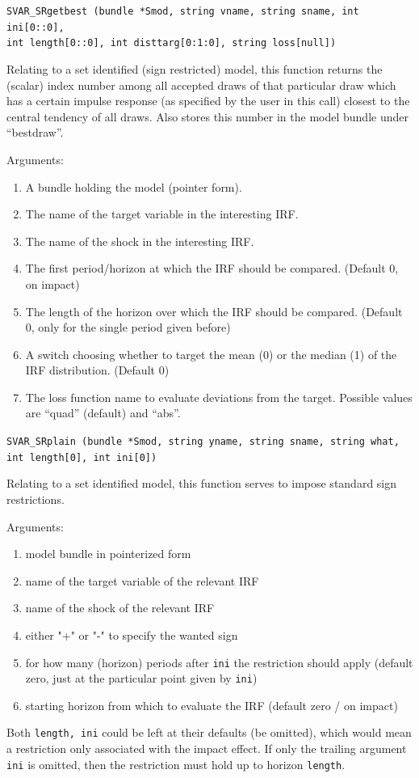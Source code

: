 \documentclass[a4paper,10pt]{article}
\newenvironment{funcdoc}[1]
{\noindent\hrulefill\newline\nopagebreak\texttt{#1}%
\nopagebreak\par\noindent\hrulefill%
\nopagebreak\par\nopagebreak\smallskip\nopagebreak\par}
{\bigskip}
\begin{document}
\begin{funcdoc}{SVAR\_SRgetbest (bundle *Smod, string vname, string sname,
    int ini[0::0], \\ int length[0::0],  int disttarg[0:1:0],  string loss[null]) }
  \noindent Relating to a set identified (sign restricted) model, this function returns
   the (scalar) index number among all accepted draws of that particular draw which has 
   a certain impulse response (as specified by the user in this call) closest to the central 
   tendency of all draws. Also stores this number in the model bundle under ``bestdraw''. 
   
  \noindent Arguments:
  \begin{enumerate}
  \item A bundle holding the model (pointer form).
  \item The name of the target variable in the interesting IRF.
  \item The name of the shock in the interesting IRF.
  \item The first period/horizon at which the IRF should be compared. (Default 0, on impact)
  \item The length of the horizon over which the IRF should be compared. (Default 0, only
  for the single period given before)
  \item A switch choosing whether to target the mean (0) or the median (1) of the IRF 
  distribution. (Default 0)
  \item The loss function name to evaluate deviations from the target. Possible values are
  ``quad'' (default) and ``abs''.
   \end{enumerate}  
\end{funcdoc}

\begin{funcdoc}{SVAR\_SRplain (bundle *Smod, string yname, string sname, string what, \\
int length[0], int ini[0])}
\noindent Relating to a set identified model, this function serves to impose standard 
 sign restrictions.
 
 \noindent Arguments:
 
 \begin{enumerate}
 \item model bundle in pointerized form
 \item name of the target variable of the relevant IRF
 \item name of the shock of the relevant IRF
 \item either "+" or "-" to specify the wanted sign
 \item for how many (horizon) periods after \texttt{ini} the restriction should apply (default zero, 
   just at the particular point given by \texttt{ini})
 \item starting horizon from which to evaluate the IRF (default zero / on impact)
 \end{enumerate}
  Both \texttt{length, ini} could be left at their defaults 
  (be omitted), which would mean a restriction only associated with the impact effect. If only the 
  trailing argument \texttt{ini} is omitted, then the restriction must hold up to horizon \texttt{length}.
  \end{funcdoc}
\end{document}

